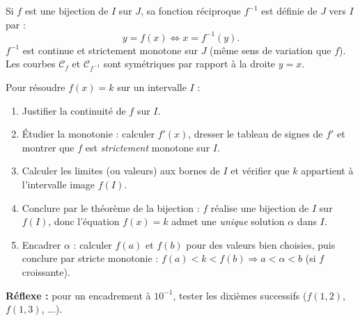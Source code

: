 \documentclass[11pt]{article}
\newcommand{\cle}[1]{{\popxbold\color{popdark}#1}}
\begin{document}
\begin{propriete}
Si $f$ est une bijection de $I$ sur $J$, sa \cle{fonction réciproque} $f^{-1}$ est définie de $J$ vers $I$ par :
\[ y = f(x) \iff x = f^{-1}(y). \]
$f^{-1}$ est continue et strictement monotone sur $J$ (même sens de variation que $f$). Les courbes $\mathcal{C}_f$ et $\mathcal{C}_{f^{-1}}$ sont symétriques par rapport à la droite $y=x$.
\end{propriete}

\begin{methode}
Pour résoudre $f(x)=k$ sur un intervalle $I$ :
\begin{enumerate}
\item \cle{Justifier la continuité} de $f$ sur $I$.
\item \cle{Étudier la monotonie} : calculer $f'(x)$, dresser le tableau de signes de $f'$ et montrer que $f$ est \emph{strictement} monotone sur $I$.
\item \cle{Calculer les limites (ou valeurs) aux bornes} de $I$ et vérifier que $k$ appartient à l'intervalle image $f(I)$.
\item \cle{Conclure par le théorème de la bijection} : $f$ réalise une bijection de $I$ sur $f(I)$, donc l'équation $f(x)=k$ admet une \emph{unique} solution $\alpha$ dans $I$.
\item \cle{Encadrer $\alpha$} : calculer $f(a)$ et $f(b)$ pour des valeurs bien choisies, puis conclure par stricte monotonie : $f(a)<k<f(b) \Rightarrow a<\alpha<b$ (si $f$ croissante).
\end{enumerate}
\textbf{Réflexe :} pour un encadrement à $10^{-1}$, tester les dixièmes successifs ($f(1{,}2)$, $f(1{,}3)$, ...).
\end{methode}
\end{document}
